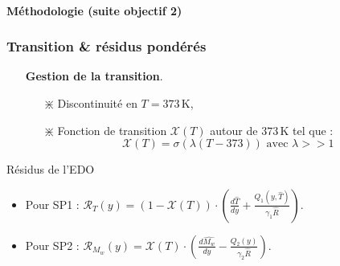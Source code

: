 \documentclass[handout]{beamer}
\newtheorem{pbm et hypo}[thm]{Problématique et hypothèses}
\begin{document}
	\begin{frame}
			\framesubtitle{\textbf{Méthodologie (suite objectif 2)}}
		\frametitle{\textbf{Transition \& résidus pondérés}}
		\begin{itemize}
		\vspace{0.3cm}
		\item[\maltese] \textbf{Gestion de la transition}.\pause
		\begin{itemize}
			\item[$\divideontimes$] Discontinuité en $T=373\,\mathrm{K}$,
			\item[$\divideontimes$] Fonction de transition $\mathcal{X}(T)$ autour de $373\,\mathrm{K}$ tel que :
			\begin{equation}
				\mathcal{X}(T) = \sigma\left(\lambda\left(T-373\right)\right) \text{ avec } \lambda >> 1
			\end{equation}
		\end{itemize}
		\end{itemize}
		
			\begin{block}{Résidus de l'EDO}\pause
			\begin{itemize}
				\item Pour SP1 : $\mathcal{R}_T(y) = \left(1-\mathcal{X}(T)\right)\cdot\left(\frac{d\hat{T}}{dy} + \frac{Q_1(y, \hat{T})}{\gamma_1 \hat{R}}\right)$.
				\item Pour SP2 : $ \mathcal{R}_{M_w}(y) = \mathcal{X}(T)\cdot\left(\frac{d\hat{M_w}}{dy} - \frac{Q_2(y)}{\gamma_2 \hat{R}}\right)$.
			\end{itemize}\pause
		\end{block} 			
	\end{frame}
	
			
\end{document}

